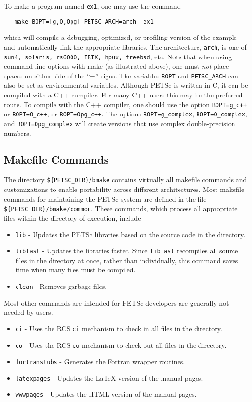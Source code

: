 To make a program named {\tt ex1}, one may use the command
\begin{verbatim}
   make BOPT=[g,O,Opg] PETSC_ARCH=arch  ex1
\end{verbatim}
which will compile a debugging, optimized, or profiling version
of the example and automatically link the appropriate libraries.  The
architecture, {\tt arch}, is one of {\tt sun4, solaris, rs6000, IRIX,
hpux, freebsd}, etc. Note
that when using command line options with make (as illustrated above),
one must {\em not} place spaces on either side of the ``='' signs.
The variables {\tt BOPT} and 
{\tt PETSC\_ARCH} can also be set as environmental
variables.  Although PETSc is written in C, it can be compiled with a 
C++ compiler.  For many C++ users this may be the preferred route. To compile
with the C++ compiler, one should use the option {\tt BOPT=g\_c++} or 
{\tt BOPT=O\_c++}, or {\tt BOPT=Opg\_c++}.  
The options {\tt BOPT=g\_complex}, {\tt BOPT=O\_complex}, and
{\tt BOPT=Opg\_complex} will
create versions that use complex double-precision numbers. 

\subsection{Makefile Commands} \label{sec:common}

The directory {\tt \$\{PETSC\_DIR\}/bmake} contains virtually all
makefile commands and customizations to enable portability across
different architectures.  Most makefile commands for maintaining the
PETSc system are defined in the file {\tt \$\{PETSC\_DIR\}/bmake/common}.  
These commands, which process all appropriate files within the
directory of execution, include
\begin{itemize}
\item {\tt lib} - Updates the PETSc libraries based on the source code
      in the directory.
\item {\tt libfast} - Updates the libraries faster.  Since
      {\tt libfast} recompiles all source files in the directory at once,
      rather than individually, this command saves time when many files
      must be compiled.
\item {\tt clean} - Removes garbage files.
\end{itemize}
\noindent Most other commands are intended for PETSc developers are generally
not needed by users.
\begin{itemize}
\item {\tt ci} - Uses the RCS {\tt ci} mechanism to check in all files in the
      directory. 
\item {\tt co} - Uses the RCS {\tt co} mechanism to check out 
      all files in the directory. 
\item {\tt fortranstubs} - Generates the Fortran wrapper routines.  
\item {\tt latexpages} - Updates the LaTeX version of the manual pages.
\item {\tt wwwpages} - Updates the HTML version of the manual pages.
\end{itemize}

